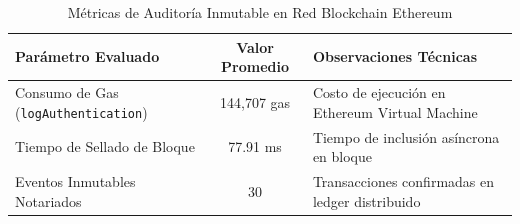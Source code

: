 \begin{table}[htbp]
\centering
\caption{Métricas de Auditoría Inmutable en Red Blockchain Ethereum}
\label{tab:blockchain_metrics}
\begin{tabular}{l|c|l}
\hline
\textbf{Parámetro Evaluado} & \textbf{Valor Promedio} & \textbf{Observaciones Técnicas} \\ \hline
Consumo de Gas (\texttt{logAuthentication}) & 144,707 gas & Costo de ejecución en Ethereum Virtual Machine \\
Tiempo de Sellado de Bloque & 77.91 ms & Tiempo de inclusión asíncrona en bloque \\
Eventos Inmutables Notariados & 30 & Transacciones confirmadas en ledger distribuido \\ \hline
\end{tabular}
\end{table}
